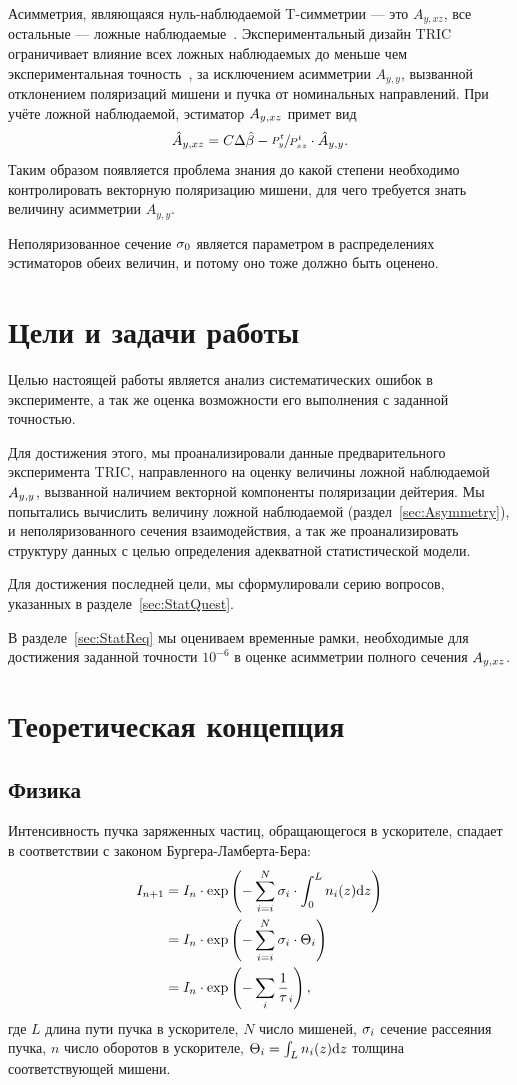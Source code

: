 \documentclass{article}
\begin{document}
	Асимметрия, являющаяся нуль-наблюдаемой T-симметрии --- это $A_{y,xz}$, все остальные --- ложные наблюдаемые~\cite{Conzett}. Экспериментальный дизайн TRIC ограничивает влияние всех ложных наблюдаемых до меньше чем экспериментальная точность~\cite{Proposal}, за исключением асимметрии $A_{y,y}$, вызванной отклонением поляризаций мишени и пучка от номинальных направлений. При учёте ложной наблюдаемой, эстиматор $\Ayxz$ примет вид
	\begin{equation}\label{eq:AyxzBiasCorrect}
	\Ayxz* = C\Delta\slp* - \sfrac{P^t_y}{P^t_{xz}}\cdot\Ayy*.
	\end{equation}
	Таким образом появляется проблема знания до какой степени необходимо контролировать векторную поляризацию мишени, для чего требуется знать величину асимметрии $A_{y,y}$. 
	
	Неполяризованное сечение $\CS[0]$ является параметром в распределениях эстиматоров обеих величин, и потому оно тоже должно быть оценено. 
		
	\section{Цели и задачи работы}
	
	Целью настоящей работы является анализ систематических ошибок в эксперименте, а так же оценка возможности его выполнения с заданной точностью. 
	
	Для достижения этого, мы проанализировали данные предварительного эксперимента TRIC, направленного на оценку величины ложной наблюдаемой $\Ayy$, вызванной наличием векторной компоненты поляризации дейтерия. Мы попытались вычислить величину ложной наблюдаемой (раздел~\ref{sec:Asymmetry}), и неполяризованного сечения взаимодействия, а так же проанализировать структуру данных с целью определения адекватной статистической модели. 
	
	Для достижения последней цели, мы сформулировали серию вопросов, указанных в разделе~\ref{sec:StatQuest}.
	
	В разделе~\ref{sec:StatReq} мы оцениваем временные рамки, необходимые для достижения заданной точности $10^{-6}$ в оценке асимметрии полного сечения $\Ayxz$.
	
	\section{Теоретическая концепция}
	\subsection{Физика}
	Интенсивность пучка заряженных частиц, обращающегося в ускорителе, спадает в соответствии с законом Бургера-Ламберта-Бера:
	\begin{align*}
	I_{n+1} &= I_n \cdot \exp\bkt{-\sum_{i=i}^N \CS[i]\cdot\int_0^L n_i(z)\td z} \\
	&= I_n \cdot \exp\bkt{-\sum_{i=i}^N \CS[i]\cdot \Thick[i]} \\
	&= I_n \cdot \exp\bkt{-\sum_i\frac1\tau_i},
	\end{align*}
	где $L$ длина пути пучка в ускорителе, $N$ число мишеней, $\CS[i]$ сечение рассеяния пучка, $n$ число оборотов в ускорителе, $\Thick[i] = \int_L n_i(z)\td z$ толщина соответствующей мишени.
	
\end{document}
